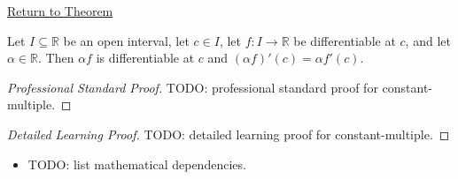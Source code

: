 \newpage
{}
\label{prf:constant-multiple}

\begin{remark*}[Return]
\hyperref[thm:constant-multiple-rule]{Return to Theorem}
\end{remark*}

\begin{theorem*}
Let $I \subseteq \mathbb{R}$ be an open interval, let $c \in I$, let $f : I \to \mathbb{R}$ be differentiable at $c$, and let $\alpha \in \mathbb{R}$. Then $\alpha f$ is differentiable at $c$ and $(\alpha f)'(c) = \alpha f'(c)$.
\end{theorem*}

\begin{proof}[Professional Standard Proof]
\LRAProofBodyStart
TODO: professional standard proof for constant-multiple.
\end{proof}

\begin{proof}[Detailed Learning Proof]
\LRAProofBodyStart
TODO: detailed learning proof for constant-multiple.
\end{proof}

\begin{remark*}
\end{remark*}

\begin{dependencies}
\begin{itemize}
  \item TODO: list mathematical dependencies.
\end{itemize}
\end{dependencies}

\clearpage
